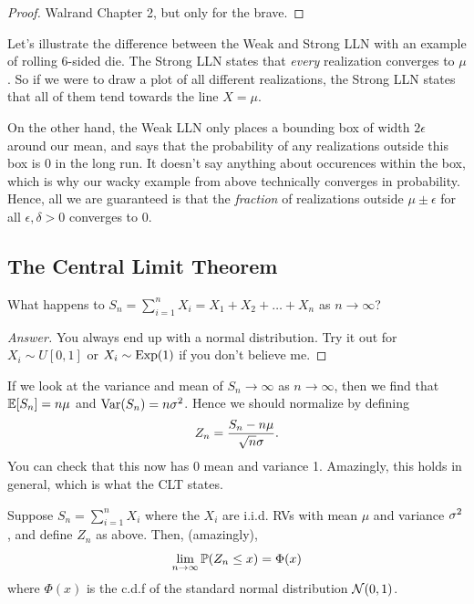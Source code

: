 \documentclass[11 pt]{scrartcl}
\begin{document}
\begin{proof}
    Walrand Chapter 2, but only for the brave. 
\end{proof}

Let's illustrate the difference between the Weak and Strong LLN with an example of rolling 6-sided die. The Strong LLN states that \emph{every} realization converges to $\mu$. So if we were to draw a plot of all different realizations, the Strong LLN states that all of them tend towards the line $X = \mu$. 

On the other hand, the Weak LLN only places a bounding box of width $2\epsilon$ around our mean, and says that the probability of any realizations outside this box is 0 in the long run. It doesn't say anything about occurences within the box, which is why our wacky example from above technically converges in probability. Hence, all we are guaranteed is that the \emph{fraction} of realizations outside $\mu\pm \epsilon$ for all $\epsilon, \delta > 0$ converges to $0$. 

\subsection{The Central Limit Theorem}

\begin{question}
    What happens to $S_n = \sum_{i = 1}^n X_i = X_1 + X_2 + \dots + X_n$ as $n\to\infty$?
\end{question}
\begin{proof}[Answer]
    You always end up with a normal distribution. Try it out for $X_i \sim U[0,1]$ or $X_i \sim \text{Exp}(1)$ if you don't believe me. 
\end{proof}

    If we look at the variance and mean of $S_n\to \infty$ as $n\to\infty$, then we find that $\mathbb E[S_n] = n\mu$ and $\text{Var}(S_n) = n\sigma^2$. Hence we should normalize by defining 
\[ Z_n = \dfrac{S_n - n\mu}{\sqrt{n}\sigma}.\] 
You can check that this now has 0 mean and variance 1. Amazingly, this holds in general, which is what the CLT states. 

\begin{theorem}
    Suppose $S_n = \sum_{i=1}^n X_i$ where the $X_i$ are i.i.d. RVs with mean $\mu$ and variance $\sigma^2$, and define $Z_n$ as above. Then, (amazingly), 
    \[ \lim_{n\to\infty} \mathbb P(Z_n\leq x) = \Phi(x) \] 
    where $\Phi(x)$ is the c.d.f of the standard normal distribution $\mathcal{N}(0, 1)$. 
\end{theorem}
\end{document}
